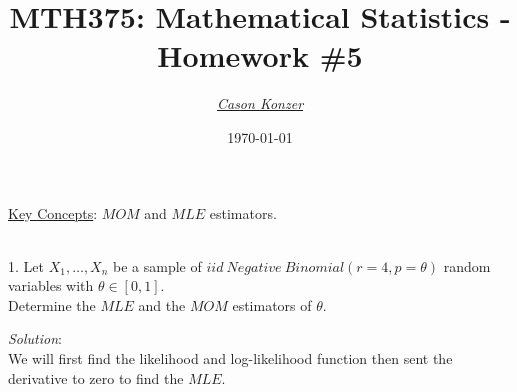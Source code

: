 \documentclass[12pt]{article}
\newcommand{\XB}{\color{black}}
\newcommand{\XBB}{\color{blue}}
\newcommand{\XV}{\color{violet}}
\begin{document}
\title{\textbf{MTH375}: Mathematical Statistics - Homework \#5}
\date{\today}
\author{\XV\textit{\large{\href{https://github.com/casonk}{Cason Konzer}}}\XB}

\maketitle
\hrulefill
\vfill 
    \underline{Key Concepts}: $ MOM $ and $ MLE $ estimators.

\newpage
\newpage
\XBB\hrulefill\XB \\

1. Let $ X_{1}, \dots , X_{n} $ be a sample of $ iid \ Negative \ Binomial(r = 4, p = \theta) $ random variables
with $ \theta \in [0, 1] $. \\ 

Determine the $ MLE $ and the $ MOM $ estimators of $ \theta $. \\

\XBB\hrulefill\XB 
\vspace{5mm}

\textit{Solution}:
\vspace{2.5mm} \\

\noindent
We will first find the likelihood and log-likelihood function then sent the derivative to zero to find the $ MLE $. \\
\end{document}
